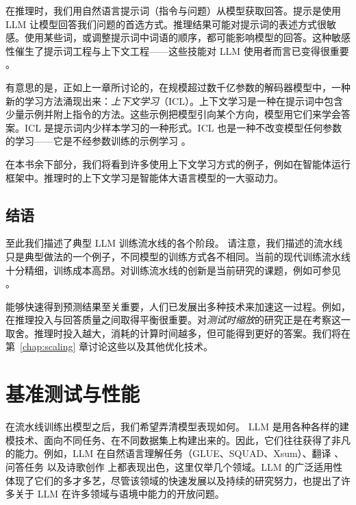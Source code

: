 在推理时，我们用自然语言提示词（指令与问题）从模型获取回答。提示是使用 LLM 让模型回答我们问题的首选方式。推理结果可能对提示词的表述方式很敏感。使用某些词，或调整提示词中词语的顺序，都可能影响模型的回答。这种敏感性催生了提示词工程与上下文工程——这些技能对 LLM 使用者而言已变得很重要 \citep{sahoo2024systematic}。

有意思的是，正如上一章所讨论的，在规模超过数千亿参数的解码器模型中，一种新的学习方法涌现出来：{\em 上下文学习}（ICL）\citep{brown2020language,wei2022emergent}。上下文学习是一种在提示词中包含少量示例并附上指令的方法。这些示例把模型引向某个方向，模型用它们来学会答案。ICL 是提示词内少样本学习的一种形式。ICL 也是一种不改变模型任何参数的学习——它是不经参数训练的示例学习 \citep{dong2022survey}。%

在本书余下部分，我们将看到许多使用上下文学习方式的例子，例如在智能体运行框架中。推理时的上下文学习是智能体大语言模型的一大驱动力。

\subsection{结语}
至此我们描述了典型 LLM 训练流水线的各个阶段。
请注意，我们描述的流水线只是典型做法的一个例子，不同模型的训练方式各不相同。当前的现代训练流水线十分精细，训练成本高昂。对训练流水线的创新是当前研究的课题，例如可参见 \citet{guo2025deepseek,team2025kimi}。

能够快速得到预测结果至关重要，人们已发展出多种技术来加速这一过程。例如，在推理投入与回答质量之间取得平衡很重要。对{\em 测试时缩放}的研究正是在考察这一取舍。推理时投入越大，消耗的计算时间越多，但可能得到更好的答案。我们将在第~\ref{chap:scaling} 章讨论这些以及其他优化技术。


\section{基准测试与性能}
\label{sec:pipeline-benchmarks}
在流水线训练出模型之后，我们希望弄清模型表现如何。
LLM 是用各种各样的建模技术、面向不同任务、在不同数据集上构建出来的。因此，它们往往获得了非凡的能力。例如，LLM 在自然语言理解任务（GLUE、SQUAD、Xsum）\citep{wang2018glue,wang2019superglue,rajpurkar2016squad,narayan2018don}、翻译 \citep{kocmi2022findings,papineni2002bleu,sennrich2015improving}、问答任务 \citep{roberts2020much} 以及诗歌创作 \citep{zhang2024llm} 上都表现出色，这里仅举几个领域。LLM 的广泛适用性体现了它们的多才多艺，尽管该领域的快速发展以及持续的研究努力，也提出了许多关于 LLM 在许多领域与语境中能力的开放问题。

